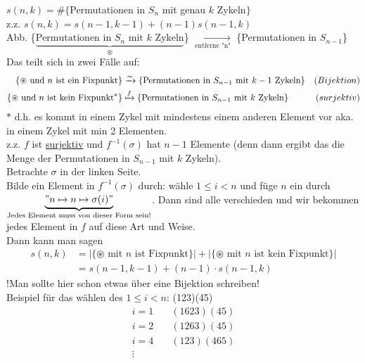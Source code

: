 \documentclass{article} %
\begin{document}
    \begin{mybox}
    $s(n,k)= \# \{$Permutationen in $S_n$ mit genau $k$ Zykeln$\}$ \\
    z.z. $s(n, k) = s(n - 1, k - 1) + (n - 1)s(n - 1, k)$ \\ \newline
    Abb. \{$\underbrace{\text{Permutationen in $S_n$ mit $k$ Zykeln}}_{\circledast}$\} $\xrightarrow[\text{entferne "n"}]{}$ \{Permutationen in $S_{n-1}$\} \\ \newline
    Das teilt sich in zwei Fälle auf: 
    \begin{align*}
        \{\circledast \text{ und $n$ ist ein Fixpunkt}\} & \xrightarrow[]{\thicksim}  \{\text{Permutationen in $S_{n-1}$ mit $k-1$ Zykeln}\} & (Bijektion)\\
        \{\circledast \text{ und $n$ ist kein Fixpunkt}^*\}  & \xmapsto[]{f} \{\text{Permutationen in $S_{n-1}$ mit $k$ Zykeln}\} & (surjektiv)
    \end{align*}
    $*$ d.h. es kommt in einem Zykel mit mindestens einem anderen Element vor aka. in einem Zykel mit min 2 Elementen. \\ 
    z.z. $f$ ist \underline{surjektiv} und $f^{-1}(\sigma)$ hat $n-1$ Elemente (denn dann ergibt das die Menge der Permutationen in $S_{n-1}$ mit $k$ Zykeln). \\ \newline
    Betrachte $\sigma$ in der linken Seite. \\
    Bilde ein Element in $f^{-1}(\sigma)$ durch: wähle $1 \leq i < n$ und füge $n$ ein durch $\underbrace{"n \mapsto n \mapsto \sigma (i)"}_{\text{Jedes Element muss von dieser Form sein!}}$. Dann sind alle verschieden und wir bekommen jedes Element in $f$ auf diese Art und Weise. \\ 
    Dann kann man sagen 
    \begin{align*}
        s(n,k) & = |\{ \circledast \text{ mit $n$ ist Fixpunkt}\}| + |\{ \circledast \text{ mit $n$ ist kein Fixpunkt}\}|  \\
        & = s(n-1, k-1) + (n-1) \cdot s(n-1, k)
    \end{align*}
    !Man sollte hier schon etwas über eine Bijektion schreiben! \\
    \newline
    Beispiel für das wählen des $1 \leq i < n$:  (123)(45)
    \begin{align*}
       i = 1 & \quad (1623)(45) \\
       i = 2 & \quad (1263)(45) \\
       i = 4 & \quad (123)(465) \\
       \vdots 
    \end{align*}
    \end{mybox}
\end{document}
